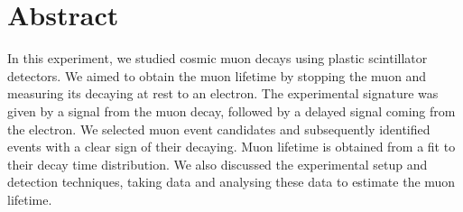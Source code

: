 \thispagestyle{plain}
\section*{Abstract}
In this experiment, we studied cosmic muon decays using plastic scintillator detectors. We aimed to obtain the muon lifetime by stopping the muon and measuring its decaying at rest to an electron. The experimental signature was given by a signal from the muon decay, followed by a delayed signal coming from the electron. We selected muon event candidates and subsequently identified events with a clear sign of their decaying. Muon lifetime is obtained from a fit to their decay time distribution. We also discussed the experimental setup and detection techniques, taking data and analysing these data to estimate the muon lifetime.
